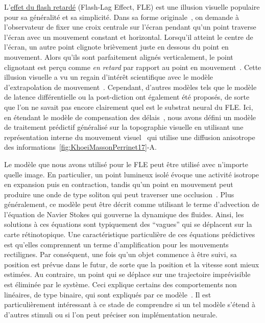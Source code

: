 L'\href{https://en.wikipedia.org/wiki/Flash_lag_illusion}{effet
du flash retardé} (Flash-Lag Effect, FLE) est une illusion visuelle populaire pour sa généralité
et sa simplicité. Dans sa forme originale~\citep{MacKay58}, on demande à
l'observateur de fixer une croix centrale sur l'écran
pendant qu'un point traverse l'écran avec un mouvement constant et
horizontal. Lorsqu'il atteint le centre de l'écran, un autre point
clignote brièvement juste en dessous du point en mouvement. Alors qu'ils
sont parfaitement alignés verticalement, le point clignotant est perçu
comme \emph{en retard} par rapport au point en mouvement~\citep{Perrinet19temps}. Cette illusion visuelle a
vu un regain d'intérêt scientifique avec le modèle d'extrapolation de
mouvement~\citep{Nijhawan02,Nijhawan09}. Cependant, d'autres
modèles tels que le modèle de latence différentielle ou la post-diction ont
également été proposés, de sorte que l'on ne savait pas encore clairement
quel est le substrat neural du FLE. Ici, en étendant le modèle de
compensation des délais~\citep{PerrinetAdamsFriston14}, nous
avons défini un modèle de traitement prédictif généralisé sur la
topographie visuelle en utilisant une représentation interne du
mouvement visuel~\citep{Perrinet12pred} qui utilise une diffusion
anisotrope des informations~\ref{fig:KhoeiMassonPerrinet17}-A.

Le modèle que nous avons utilisé pour le FLE peut être utilisé avec
n'importe quelle image. En particulier, un point lumineux isolé évoque une
activité isotrope en expansion puis en contraction, tandis qu'un point
en mouvement peut produire une onde de type soliton qui peut traverser
une occlusion~\citep{Khoei13jpp}. Plus généralement, ce
modèle peut être décrit comme  utilisant le terme d'advection de l'équation de Navier
Stokes qui gouverne la dynamique des fluides. Ainsi,
les solutions à ces équations sont typiquement des ``vagues'' qui se
déplacent sur la carte rétinotopique. Une caractéristique particulière
de ces équations prédictives est qu'elles comprennent un terme d'amplification pour les
mouvements rectilignes. Par conséquent, une fois qu'un objet commence à
être suivi, sa position est prévue dans le futur, de sorte que la
position et la vitesse sont mieux estimées. Au contraire, un point qui
se déplace sur une trajectoire imprévisible est éliminée par le système.
Ceci explique certains des comportements non linéaires, de type
binaire, qui sont expliqués par ce modèle~\citep{Perrinet12pred}. Il est
particulièrement intéressant à ce stade de comprendre si un tel modèle
s'étend à d'autres stimuli ou si l'on peut préciser son implémentation
neurale.

